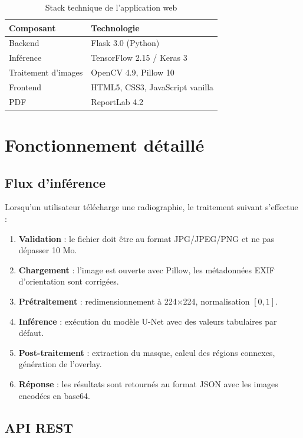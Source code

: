 \documentclass[12pt,a4paper,twoside]{report}
\begin{document}
\begin{table}[H]
\centering
\begin{tabular}{ll}
\toprule
\textbf{Composant} & \textbf{Technologie} \\
\midrule
Backend & Flask 3.0 (Python) \\
Inférence & TensorFlow 2.15 / Keras 3 \\
Traitement d'images & OpenCV 4.9, Pillow 10 \\
Frontend & HTML5, CSS3, JavaScript vanilla \\
PDF & ReportLab 4.2 \\
\bottomrule
\end{tabular}
\caption{Stack technique de l'application web}
\end{table}

\section{Fonctionnement détaillé}

\subsection{Flux d'inférence}

Lorsqu'un utilisateur télécharge une radiographie, le traitement suivant s'effectue :

\begin{enumerate}
  \item \textbf{Validation} : le fichier doit être au format JPG/JPEG/PNG et ne pas dépasser 10 Mo.
  \item \textbf{Chargement} : l'image est ouverte avec Pillow, les métadonnées EXIF d'orientation sont corrigées.
  \item \textbf{Prétraitement} : redimensionnement à 224$\times$224, normalisation $[0, 1]$.
  \item \textbf{Inférence} : exécution du modèle U-Net avec des valeurs tabulaires par défaut.
  \item \textbf{Post-traitement} : extraction du masque, calcul des régions connexes, génération de l'overlay.
  \item \textbf{Réponse} : les résultats sont retournés au format JSON avec les images encodées en base64.
\end{enumerate}

\subsection{API REST}
\end{document}
